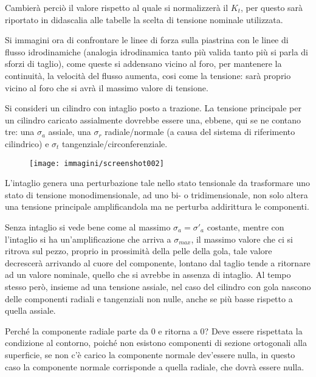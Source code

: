 \documentclass{article}
\begin{document}
\begin{adjustwidth}{2in}{}
		Cambierà perciò il valore rispetto al quale si normalizzerà il $K_t$, per questo sarà riportato in didascalia alle tabelle la scelta di tensione nominale utilizzata. \newline 
		
		Si immagini ora di confrontare le linee di forza sulla piastrina con le linee di flusso idrodinamiche (analogia idrodinamica tanto più valida tanto più si parla di sforzi di taglio), come queste si addensano vicino al foro, per mantenere la continuità, la velocità del flusso aumenta, cosi come la tensione: sarà proprio vicino al foro che si avrà il massimo valore di tensione. \newline 
		
		Si consideri un cilindro con intaglio posto a trazione. La tensione principale per un cilindro caricato assialmente dovrebbe essere una, ebbene, qui se ne contano tre: una $\sigma_a$ assiale, una $\sigma_r$ radiale/normale (a causa del sistema di riferimento cilindrico) e $\sigma_t$ tangenziale/circonferenziale. 
		
		\begin{figure}[H]
			\centering
			\texttt{[image: immagini/screenshot002]}
			\label{fig:screenshot002}
		\end{figure}
				
		L'intaglio genera una perturbazione tale nello stato tensionale da trasformare uno stato di tensione monodimensionale, ad uno bi- o tridimensionale, non solo altera una tensione principale amplificandola ma ne perturba addirittura le componenti. \newline 
		
		Senza intaglio si vede bene come al massimo $\sigma_a = \sigma'_a$ costante, mentre con l'intaglio si ha un'amplificazione che arriva a $\sigma_{max}$, il massimo valore che ci si ritrova sul pezzo, proprio in prossimità della pelle della gola, tale valore decrescerà arrivando al cuore del componente, lontano dal taglio tende a ritornare ad un valore nominale, quello che si avrebbe in assenza di intaglio. 
		Al tempo stesso però, insieme ad una tensione assiale, nel caso del cilindro con gola nascono delle componenti radiali e tangenziali non nulle, anche se più basse rispetto a quella assiale. 
		
		Perché la componente radiale parte da $0$ e ritorna a $0$? Deve essere rispettata la condizione al contorno, poiché non esistono componenti di sezione ortogonali alla superficie, se non c'è carico la componente normale dev'essere nulla, in questo caso la componente normale corrisponde a quella radiale, che dovrà essere nulla. \newline
		

\end{adjustwidth}
\end{document}
